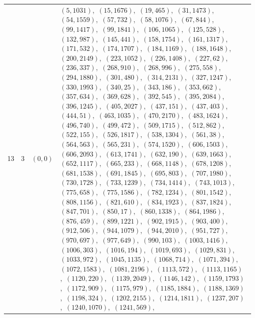 \documentclass[11pt]{article}
\begin{document}
\begin{longtable}{@{}rrl>{\raggedright\arraybackslash}p{}@{}}
13 & 3 & $(0,0)$ & $(5,1031)$,\allowbreak\ $(15,1676)$,\allowbreak\ $(19,465)$,\allowbreak\ $(31,1473)$,\allowbreak\ $(54,1559)$,\allowbreak\ $(57,732)$,\allowbreak\ $(58,1076)$,\allowbreak\ $(67,844)$,\allowbreak\ $(99,1417)$,\allowbreak\ $(99,1841)$,\allowbreak\ $(106,1065)$,\allowbreak\ $(125,528)$,\allowbreak\ $(132,987)$,\allowbreak\ $(145,441)$,\allowbreak\ $(158,1754)$,\allowbreak\ $(161,1317)$,\allowbreak\ $(171,532)$,\allowbreak\ $(174,1707)$,\allowbreak\ $(184,1169)$,\allowbreak\ $(188,1648)$,\allowbreak\ $(200,2149)$,\allowbreak\ $(223,1052)$,\allowbreak\ $(226,1408)$,\allowbreak\ $(227,62)$,\allowbreak\ $(236,337)$,\allowbreak\ $(268,910)$,\allowbreak\ $(268,996)$,\allowbreak\ $(275,558)$,\allowbreak\ $(294,1880)$,\allowbreak\ $(301,480)$,\allowbreak\ $(314,2131)$,\allowbreak\ $(327,1247)$,\allowbreak\ $(330,1993)$,\allowbreak\ $(340,25)$,\allowbreak\ $(343,186)$,\allowbreak\ $(353,662)$,\allowbreak\ $(357,634)$,\allowbreak\ $(369,628)$,\allowbreak\ $(392,545)$,\allowbreak\ $(395,2084)$,\allowbreak\ $(396,1245)$,\allowbreak\ $(405,2027)$,\allowbreak\ $(437,151)$,\allowbreak\ $(437,403)$,\allowbreak\ $(444,51)$,\allowbreak\ $(463,1035)$,\allowbreak\ $(470,2170)$,\allowbreak\ $(483,1624)$,\allowbreak\ $(496,740)$,\allowbreak\ $(499,472)$,\allowbreak\ $(509,1715)$,\allowbreak\ $(512,862)$,\allowbreak\ $(522,155)$,\allowbreak\ $(526,1817)$,\allowbreak\ $(538,1304)$,\allowbreak\ $(561,38)$,\allowbreak\ $(564,563)$,\allowbreak\ $(565,231)$,\allowbreak\ $(574,1520)$,\allowbreak\ $(606,1503)$,\allowbreak\ $(606,2093)$,\allowbreak\ $(613,1741)$,\allowbreak\ $(632,190)$,\allowbreak\ $(639,1663)$,\allowbreak\ $(652,1117)$,\allowbreak\ $(665,233)$,\allowbreak\ $(668,1148)$,\allowbreak\ $(678,1208)$,\allowbreak\ $(681,1538)$,\allowbreak\ $(691,1845)$,\allowbreak\ $(695,803)$,\allowbreak\ $(707,1980)$,\allowbreak\ $(730,1728)$,\allowbreak\ $(733,1239)$,\allowbreak\ $(734,1414)$,\allowbreak\ $(743,1013)$,\allowbreak\ $(775,658)$,\allowbreak\ $(775,1586)$,\allowbreak\ $(782,1234)$,\allowbreak\ $(801,1542)$,\allowbreak\ $(808,1156)$,\allowbreak\ $(821,610)$,\allowbreak\ $(834,1923)$,\allowbreak\ $(837,1824)$,\allowbreak\ $(847,701)$,\allowbreak\ $(850,17)$,\allowbreak\ $(860,1338)$,\allowbreak\ $(864,1986)$,\allowbreak\ $(876,459)$,\allowbreak\ $(899,1221)$,\allowbreak\ $(902,1915)$,\allowbreak\ $(903,400)$,\allowbreak\ $(912,506)$,\allowbreak\ $(944,1079)$,\allowbreak\ $(944,2010)$,\allowbreak\ $(951,727)$,\allowbreak\ $(970,697)$,\allowbreak\ $(977,649)$,\allowbreak\ $(990,103)$,\allowbreak\ $(1003,1416)$,\allowbreak\ $(1006,303)$,\allowbreak\ $(1016,194)$,\allowbreak\ $(1019,693)$,\allowbreak\ $(1029,831)$,\allowbreak\ $(1033,972)$,\allowbreak\ $(1045,1135)$,\allowbreak\ $(1068,714)$,\allowbreak\ $(1071,394)$,\allowbreak\ $(1072,1583)$,\allowbreak\ $(1081,2196)$,\allowbreak\ $(1113,572)$,\allowbreak\ $(1113,1165)$,\allowbreak\ $(1120,220)$,\allowbreak\ $(1139,2049)$,\allowbreak\ $(1146,142)$,\allowbreak\ $(1159,1793)$,\allowbreak\ $(1172,909)$,\allowbreak\ $(1175,979)$,\allowbreak\ $(1185,1884)$,\allowbreak\ $(1188,1369)$,\allowbreak\ $(1198,324)$,\allowbreak\ $(1202,2155)$,\allowbreak\ $(1214,1811)$,\allowbreak\ $(1237,207)$,\allowbreak\ $(1240,1070)$,\allowbreak\ $(1241,569)$,\allowbreak\ 
\end{longtable}
\end{document}
